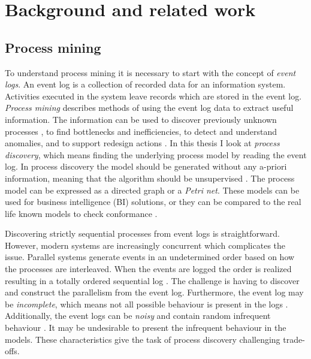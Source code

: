 
\clearpage
\section{Background and related work}
\label{sec:background}

\subsection{Process mining}

To understand process mining it is necessary to start with the concept of \emph{event logs}.
An event log is a collection of recorded data for an information system.
Activities executed in the system leave records which are stored in the event log.
\emph{Process mining} describes methods of using the event log data to extract useful information.
The information can be used to discover previously unknown processes , to find bottlenecks and inefficiencies, to detect and understand anomalies, and to support redesign actions \cite{van2015extracting}.
In this thesis I look at \emph{process discovery}, which means finding the underlying process model
by reading the event log.
In process discovery the model should be generated without any a-priori information, meaning that the algorithm should be unsupervised \cite{van2013discovering}.
The process model can be expressed as a directed graph or a \emph{Petri net}.
These models can be used for business intelligence (BI) solutions, or they can be compared to the real life
known models to check conformance \cite{van2013discovering}.


Discovering strictly sequential processes from event logs is straightforward. However, modern systems are increasingly concurrent which complicates the issue. 
Parallel systems generate events in an undetermined order based on how the processes are interleaved. 
When the events are logged the order is realized resulting in a totally ordered sequential log \cite{van2004workflow}. 
The challenge is having to discover and construct the parallelism from the event log.
Furthermore, the event log may be \emph{incomplete}, which means not all possible behaviour is present in the logs \cite{van2013discovering}.
Additionally, the event logs can be \emph{noisy} and contain random infrequent behaviour \cite{van2013discovering}.
It may be undesirable to present the infrequent behaviour in the models.
These characteristics give the task of process discovery challenging trade-offs.

